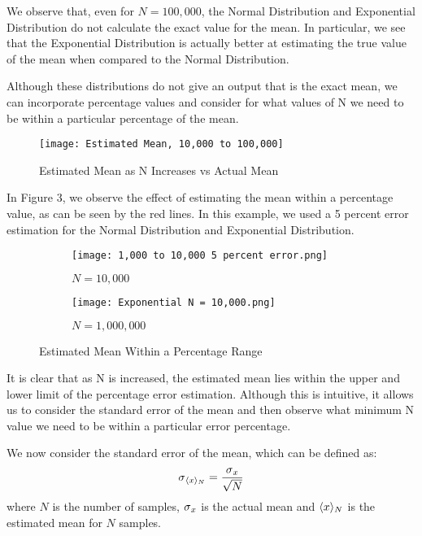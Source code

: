 \documentclass[12pt]{article}
\begin{document}
We observe that, even for $N = 100,000$, the Normal Distribution and Exponential Distribution do not calculate the exact value for the mean. In particular, we see that the Exponential Distribution is actually better at estimating the true value of the mean when compared to the Normal Distribution. 

Although these distributions do not give an output that is the exact mean, we can incorporate percentage values and consider for what values of N we need to be within a particular percentage of the mean. 

\begin{figure}[h!]
  \texttt{[image: Estimated Mean, 10,000 to 100,000]}
  \caption{Estimated Mean as N Increases vs Actual Mean}
  \label{fig:estimated_mean}
\end{figure}

In Figure 3, we observe the effect of estimating the mean within a percentage value, as can be seen by the red lines. In this example, we used a 5 percent error estimation for the Normal Distribution and Exponential Distribution.

\begin{figure}[h]
\begin{subfigure}{0.5\textwidth}
\texttt{[image: 1,000 to 10,000 5 percent error.png]} 
\caption{$N = 10,000$}
\label{fig:subim1}
\end{subfigure}
\begin{subfigure}{0.5\textwidth}
\texttt{[image: Exponential N = 10,000.png]}
\caption{$N = 1,000,000$}
\label{fig:subim2}
\end{subfigure}
\caption{Estimated Mean Within a Percentage Range}
\label{fig:image2}
\end{figure}

It is clear that as N is increased, the estimated mean lies within the upper and lower limit of the percentage error estimation. Although this is intuitive, it allows us to consider the standard error of the mean and then observe what minimum N value we need to be within a particular error percentage. 

We now consider the standard error of the mean, which can be defined as:
\begin{align}
\sigma\textsubscript{$\langle x\rangle$\textsubscript{$N$}}  = \frac{\sigma\textsubscript{$x$}}{\sqrt{N}}
\end{align}
where $N$ is the number of samples, $\sigma\textsubscript{$x$}$ is the actual mean and $\langle x\rangle\textsubscript{$N$}$ is the estimated mean for $N$ samples.
\end{document}
